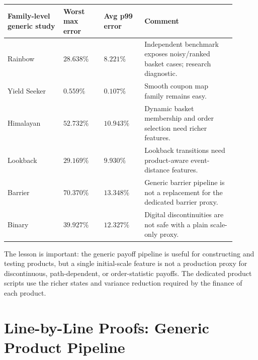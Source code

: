 \documentclass[11pt,oneside]{book}
\theoremstyle{definition}
\begin{document}
\begin{longtable}{@{}>{\raggedright\arraybackslash}p{0.22\linewidth}>{\raggedleft\arraybackslash}p{0.16\linewidth}>{\raggedleft\arraybackslash}p{0.16\linewidth}>{\raggedright\arraybackslash}p{0.36\linewidth}@{}}
\toprule
Family-level generic study & Worst max error & Avg p99 error & Comment\\
\midrule
Rainbow & \(28.638\%\) & \(8.221\%\) & Independent benchmark exposes noisy/ranked basket cases; research diagnostic.\\
Yield Seeker & \(0.559\%\) & \(0.107\%\) & Smooth coupon map family remains easy.\\
Himalayan & \(52.732\%\) & \(10.943\%\) & Dynamic basket membership and order selection need richer features.\\
Lookback & \(29.169\%\) & \(9.930\%\) & Lookback transitions need product-aware event-distance features.\\
Barrier & \(70.370\%\) & \(13.348\%\) & Generic barrier pipeline is not a replacement for the dedicated barrier proxy.\\
Binary & \(39.927\%\) & \(12.327\%\) & Digital discontinuities are not safe with a plain scale-only proxy.\\
\bottomrule
\end{longtable}

The lesson is important: the generic payoff pipeline is useful for constructing and testing products, but a single initial-scale feature is not a production proxy for discontinuous, path-dependent, or order-statistic payoffs. The dedicated product scripts use the richer states and variance reduction required by the finance of each product.

\appendix

\chapter{Line-by-Line Proofs: Generic Product Pipeline}
\end{document}
